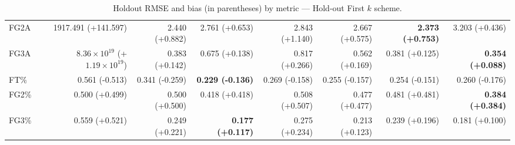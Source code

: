 \documentclass{article}
\begin{document}
\begin{table}[H]
{\begin{tabular}{lrrrrrrr}
FG2A & 1917.491 (+141.597) & 2.440 (+0.882) & 2.761 (+0.653) & 2.843 (+1.140) & 2.667 (+0.575) & \textbf{2.373 (+0.753)} & 3.203 (+0.436) \\
FG3A & $8.36\times10^{19}$ (+$1.19\times10^{19}$) & 0.383 (+0.142) & 0.675 (+0.138) & 0.817 (+0.266) & 0.562 (+0.169) & 0.381 (+0.125) & \textbf{0.354 (+0.088)} \\
FT\% & 0.561 (-0.513) & 0.341 (-0.259) & \textbf{0.229 (-0.136)} & 0.269 (-0.158) & 0.255 (-0.157) & 0.254 (-0.151) & 0.260 (-0.176) \\
FG2\% & 0.500 (+0.499) & 0.500 (+0.500) & 0.418 (+0.418) & 0.508 (+0.507) & 0.477 (+0.477) & 0.481 (+0.481) & \textbf{0.384 (+0.384)} \\
FG3\% & 0.559 (+0.521) & 0.249 (+0.221) & \textbf{0.177 (+0.117)} & 0.275 (+0.234) & 0.213 (+0.123) & 0.239 (+0.196) & 0.181 (+0.100) \\
\bottomrule
\end{tabular}
}
\caption{Holdout RMSE and bias (in parentheses) by metric — Hold-out First $k$ scheme.}
\label{tab:coverage_holdout_first_k}
\end{table}
\end{document}
